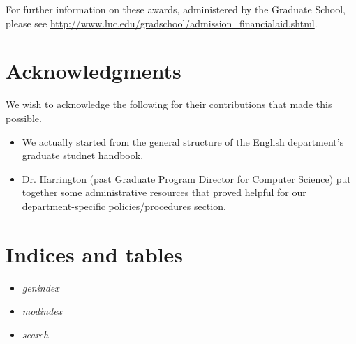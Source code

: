 \documentclass[letterpaper,10pt,english]{sphinxmanual}
\begin{document}
For further information on these awards, administered by the Graduate School, please see \href{http://www.luc.edu/gradschool/admission\_financialaid.shtml}{http://www.luc.edu/gradschool/admission\_financialaid.shtml}.


\chapter{Acknowledgments}
\label{acknowledgments::doc}\label{acknowledgments:acknowledgments}
We wish to acknowledge the following for their contributions that made this possible.
\begin{itemize}
\item {} 
We actually started from the general structure of the English department's graduate studnet handbook.

\item {} 
Dr. Harrington (past Graduate Program Director for Computer Science) put together some administrative resources that proved helpful for our department-specific policies/procedures section.

\end{itemize}


\chapter{Indices and tables}
\label{index:indices-and-tables}\begin{itemize}
\item {} 
\emph{genindex}

\item {} 
\emph{modindex}

\item {} 
\emph{search}

\end{itemize}



\renewcommand{\indexname}{Index}
\printindex
\end{document}
